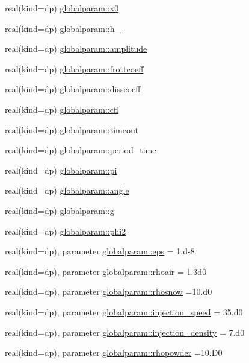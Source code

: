 \begin{DoxyCompactItemize}
\item 
real(kind=dp) \mbox{\hyperlink{namespaceglobalparam_a9e5d836cf78ed835befb0354a98e7e17}{globalparam\+::x0}}
\item 
real(kind=dp) \mbox{\hyperlink{namespaceglobalparam_afa512f0663f1649ec948dd8629ded9c2}{globalparam\+::h\+\_}}
\item 
real(kind=dp) \mbox{\hyperlink{namespaceglobalparam_ad4de2aae56528f5e68832e367c812b7e}{globalparam\+::amplitude}}
\item 
real(kind=dp) \mbox{\hyperlink{namespaceglobalparam_a3d60c54a7f29c018175090d8f352e532}{globalparam\+::frottcoeff}}
\item 
real(kind=dp) \mbox{\hyperlink{namespaceglobalparam_a2b80e7d2d9fedcf41afb3a695951758b}{globalparam\+::disscoeff}}
\item 
real(kind=dp) \mbox{\hyperlink{namespaceglobalparam_adfd0d04d365d8eea624298b512502b3a}{globalparam\+::cfl}}
\item 
real(kind=dp) \mbox{\hyperlink{namespaceglobalparam_a10139a2787968ad3cf07f503ad8dd164}{globalparam\+::timeout}}
\item 
real(kind=dp) \mbox{\hyperlink{namespaceglobalparam_aedbaf94b837b9fa76dfe9fb6d99b21b4}{globalparam\+::period\+\_\+time}}
\item 
real(kind=dp) \mbox{\hyperlink{namespaceglobalparam_af8b4334cb676810d60c0e1a746531412}{globalparam\+::pi}}
\item 
real(kind=dp) \mbox{\hyperlink{namespaceglobalparam_afc46f9587744d04e67298c60303cd5f0}{globalparam\+::angle}}
\item 
real(kind=dp) \mbox{\hyperlink{namespaceglobalparam_a5ea70464e51d2dc580f4c6c8b451cb01}{globalparam\+::g}}
\item 
real(kind=dp) \mbox{\hyperlink{namespaceglobalparam_a7e2e3cc9c0b15b0250b31dd03fb704c6}{globalparam\+::phi2}}
\item 
real(kind=dp), parameter \mbox{\hyperlink{namespaceglobalparam_a50294033ac3a178743643d3203a2d364}{globalparam\+::eps}} = 1.d-\/8
\item 
real(kind=dp), parameter \mbox{\hyperlink{namespaceglobalparam_a1c7a6cb7b83fcf9d8d91ed682e3f332d}{globalparam\+::rhoair}} = 1.\+3d0
\item 
real(kind=dp), parameter \mbox{\hyperlink{namespaceglobalparam_a81ffdb6e04df75fd95fe27a7fffc1328}{globalparam\+::rhosnow}} =10.d0
\item 
real(kind=dp), parameter \mbox{\hyperlink{namespaceglobalparam_abc246d4846a0210b41718b0d3cc67dc0}{globalparam\+::injection\+\_\+speed}} = 35.d0
\item 
real(kind=dp), parameter \mbox{\hyperlink{namespaceglobalparam_a241102bcabaffc164f5d5bb9dcd1f2d8}{globalparam\+::injection\+\_\+density}} = 7.d0
\item 
real(kind=dp), parameter \mbox{\hyperlink{namespaceglobalparam_a6c7de558883b37c3d3e5e7b55250ed99}{globalparam\+::rhopowder}} =10.D0
\end{DoxyCompactItemize}


